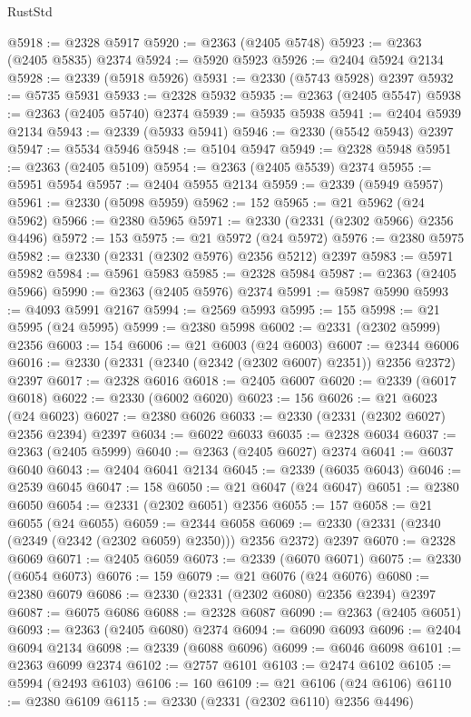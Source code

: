 \begin{lexlean}{RustStd}
\begin{coremodule}
@5918 := @2328 @5917
@5920 := @2363 (@2405 @5748)
@5923 := @2363 (@2405 @5835) @2374
@5924 := @5920 @5923
@5926 := @2404 @5924 @2134
@5928 := @2339 (@5918 @5926)
@5931 := @2330 (@5743 @5928) @2397
@5932 := @5735 @5931
@5933 := @2328 @5932
@5935 := @2363 (@2405 @5547)
@5938 := @2363 (@2405 @5740) @2374
@5939 := @5935 @5938
@5941 := @2404 @5939 @2134
@5943 := @2339 (@5933 @5941)
@5946 := @2330 (@5542 @5943) @2397
@5947 := @5534 @5946
@5948 := @5104 @5947
@5949 := @2328 @5948
@5951 := @2363 (@2405 @5109)
@5954 := @2363 (@2405 @5539) @2374
@5955 := @5951 @5954
@5957 := @2404 @5955 @2134
@5959 := @2339 (@5949 @5957)
@5961 := @2330 (@5098 @5959)
@5962 := 152
@5965 := @21 @5962 (@24 @5962)
@5966 := @2380 @5965
@5971 := @2330 (@2331 (@2302 @5966) @2356 @4496)
@5972 := 153
@5975 := @21 @5972 (@24 @5972)
@5976 := @2380 @5975
@5982 := @2330 (@2331 (@2302 @5976) @2356 @5212) @2397
@5983 := @5971 @5982
@5984 := @5961 @5983
@5985 := @2328 @5984
@5987 := @2363 (@2405 @5966)
@5990 := @2363 (@2405 @5976) @2374
@5991 := @5987 @5990
@5993 := @4093 @5991 @2167
@5994 := @2569 @5993
@5995 := 155
@5998 := @21 @5995 (@24 @5995)
@5999 := @2380 @5998
@6002 := @2331 (@2302 @5999) @2356
@6003 := 154
@6006 := @21 @6003 (@24 @6003)
@6007 := @2344 @6006
@6016 := @2330 (@2331 (@2340 (@2342 (@2302 @6007) @2351)) @2356 @2372) @2397
@6017 := @2328 @6016
@6018 := @2405 @6007
@6020 := @2339 (@6017 @6018)
@6022 := @2330 (@6002 @6020)
@6023 := 156
@6026 := @21 @6023 (@24 @6023)
@6027 := @2380 @6026
@6033 := @2330 (@2331 (@2302 @6027) @2356 @2394) @2397
@6034 := @6022 @6033
@6035 := @2328 @6034
@6037 := @2363 (@2405 @5999)
@6040 := @2363 (@2405 @6027) @2374
@6041 := @6037 @6040
@6043 := @2404 @6041 @2134
@6045 := @2339 (@6035 @6043)
@6046 := @2539 @6045
@6047 := 158
@6050 := @21 @6047 (@24 @6047)
@6051 := @2380 @6050
@6054 := @2331 (@2302 @6051) @2356
@6055 := 157
@6058 := @21 @6055 (@24 @6055)
@6059 := @2344 @6058
@6069 := @2330 (@2331 (@2340 (@2349 (@2342 (@2302 @6059) @2350))) @2356 @2372) @2397
@6070 := @2328 @6069
@6071 := @2405 @6059
@6073 := @2339 (@6070 @6071)
@6075 := @2330 (@6054 @6073)
@6076 := 159
@6079 := @21 @6076 (@24 @6076)
@6080 := @2380 @6079
@6086 := @2330 (@2331 (@2302 @6080) @2356 @2394) @2397
@6087 := @6075 @6086
@6088 := @2328 @6087
@6090 := @2363 (@2405 @6051)
@6093 := @2363 (@2405 @6080) @2374
@6094 := @6090 @6093
@6096 := @2404 @6094 @2134
@6098 := @2339 (@6088 @6096)
@6099 := @6046 @6098
@6101 := @2363 @6099 @2374
@6102 := @2757 @6101
@6103 := @2474 @6102
@6105 := @5994 (@2493 @6103)
@6106 := 160
@6109 := @21 @6106 (@24 @6106)
@6110 := @2380 @6109
@6115 := @2330 (@2331 (@2302 @6110) @2356 @4496)

\end{coremodule}
\end{lexlean}
